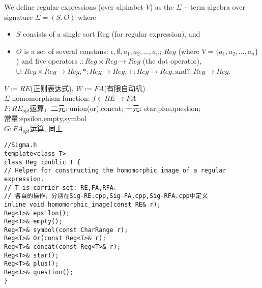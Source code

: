 \begin{definition}
	We define regular expressions (over alphabet $V$) as the $\Sigma -$term algebra over signature $\Sigma=(S,O)$ where
	\begin{itemize}
		\item $S$ consists of a single sort Reg (for regular expression), and
		\item $O$ is a set of several constans: $\epsilon,\emptyset,a_1,a_2,\dots,a_n$; $Reg$ (where $V=\{a_1,a_2,\dots,a_n\}$) and five operators $.:Reg\times Reg\to Reg$ (the dot operator), $\cup : Reg\times Reg\to Reg, \ast : Reg\to Reg,+:Reg\to Reg,\text{and} ?:Reg\to Reg$.
	\end{itemize}
\end{definition}

$V := RE$(正则表达式), $W := FA$(有限自动机)\\
$\Sigma$-homomorphism function: $f\in RE\to FA$ \\
$F:RE_{opt}$运算，二元: union(or),concat; 一元: star,plus,question;\\ 常量:epsilon,empty,symbol\\ 
$G:FA_{opt}$运算, 同上\\


\begin{lstlisting}
//Sigma.h
template<class T>
class Reg :public T {
// Helper for constructing the homomorphic image of a regular expression.
// T is carrier set: RE,FA,RFA，
// 各自的操作，分别在Sig-RE.cpp,Sig-FA.cpp,Sig-RFA.cpp中定义
inline void homomorphic_image(const RE& r);
Reg<T>& epsilon();
Reg<T>& empty();
Reg<T>& symbol(const CharRange r);
Reg<T>& Or(const Reg<T>& r);
Reg<T>& concat(const Reg<T>& r);
Reg<T>& star();
Reg<T>& plus();
Reg<T>& question();
}
\end{lstlisting}

